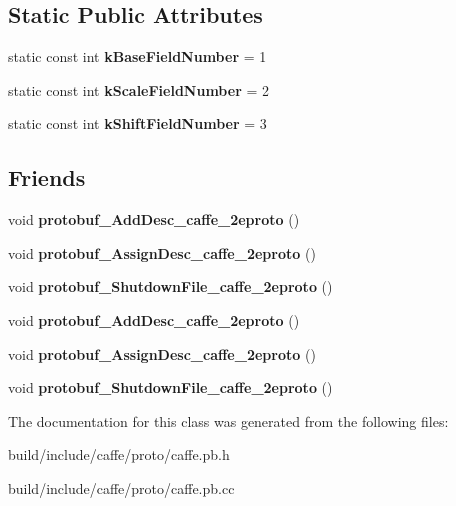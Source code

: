 \subsection*{Static Public Attributes}
\begin{DoxyCompactItemize}
\item 
\mbox{\label{classcaffe_1_1_exp_parameter_af0be51e90e1838ad04997e699ad22ad7}} 
static const int {\bfseries k\+Base\+Field\+Number} = 1
\item 
\mbox{\label{classcaffe_1_1_exp_parameter_abba66c005f406b9baed0d9628f4c0ca4}} 
static const int {\bfseries k\+Scale\+Field\+Number} = 2
\item 
\mbox{\label{classcaffe_1_1_exp_parameter_ac8707781a4d601c2c7a7a7fa968aa446}} 
static const int {\bfseries k\+Shift\+Field\+Number} = 3
\end{DoxyCompactItemize}
\subsection*{Friends}
\begin{DoxyCompactItemize}
\item 
\mbox{\label{classcaffe_1_1_exp_parameter_a2670a9c8ffd0e5105cf7522cd6f8613d}} 
void {\bfseries protobuf\+\_\+\+Add\+Desc\+\_\+caffe\+\_\+2eproto} ()
\item 
\mbox{\label{classcaffe_1_1_exp_parameter_a7f145bddbdde78003d27e42c7e003d23}} 
void {\bfseries protobuf\+\_\+\+Assign\+Desc\+\_\+caffe\+\_\+2eproto} ()
\item 
\mbox{\label{classcaffe_1_1_exp_parameter_a026784a8e4e76f1b4daf9d033d2ece83}} 
void {\bfseries protobuf\+\_\+\+Shutdown\+File\+\_\+caffe\+\_\+2eproto} ()
\item 
\mbox{\label{classcaffe_1_1_exp_parameter_a2670a9c8ffd0e5105cf7522cd6f8613d}} 
void {\bfseries protobuf\+\_\+\+Add\+Desc\+\_\+caffe\+\_\+2eproto} ()
\item 
\mbox{\label{classcaffe_1_1_exp_parameter_a7f145bddbdde78003d27e42c7e003d23}} 
void {\bfseries protobuf\+\_\+\+Assign\+Desc\+\_\+caffe\+\_\+2eproto} ()
\item 
\mbox{\label{classcaffe_1_1_exp_parameter_a026784a8e4e76f1b4daf9d033d2ece83}} 
void {\bfseries protobuf\+\_\+\+Shutdown\+File\+\_\+caffe\+\_\+2eproto} ()
\end{DoxyCompactItemize}


The documentation for this class was generated from the following files\+:\begin{DoxyCompactItemize}
\item 
build/include/caffe/proto/caffe.\+pb.\+h\item 
build/include/caffe/proto/caffe.\+pb.\+cc\end{DoxyCompactItemize}
